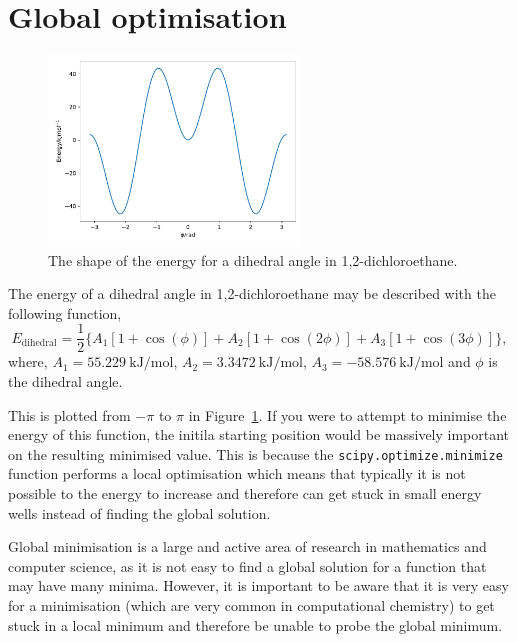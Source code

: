 \documentclass[a4paper]{article}
\begin{document}
\section{Global optimisation}
%
\begin{figure}[t]
\centering
\includegraphics[width=0.6\textwidth]{dihedral}
\caption{\label{fig:dihed} The shape of the energy for a  dihedral angle in 1,2-dichloroethane.}
\end{figure}
%

The energy of a  dihedral angle in 1,2-dichloroethane may be described with the following function,
%
\begin{equation}
  E_{\text{dihedral}} = \frac{1}{2} \{A_1[1 + \cos(\phi)] + A_2[1 + \cos(2\phi)] + A_3[1 + \cos(3\phi)]\},
  \label{equ:dihed}
\end{equation}
%
where, $A_1 = \SI{55.229}{\kilo\joule\per\mole}$, $A_2 = \SI{3.3472}{\kilo\joule\per\mole}$, $A_3 = \SI{-58.576}{\kilo\joule\per\mole}$ and $\phi$ is the dihedral angle.

This is plotted from $-\pi$ to $\pi$ in Figure~\ref{fig:dihed}.
If you were to attempt to minimise the energy of this function, the initila starting position would be massively important on the resulting minimised value.
This is because the \texttt{scipy.optimize.minimize} function performs a local optimisation which means that typically it is not possible to the energy to increase and therefore can get stuck in small energy wells instead of finding the global solution.

Global minimisation is a large and active area of research in mathematics and computer science, as it is not easy to find a global solution for a function that may have many minima.
However, it is important to be aware that it is very easy for a minimisation (which are very common in computational chemistry) to get stuck in a local minimum and therefore be unable to probe the global minimum. 

%
%
\end{document}
